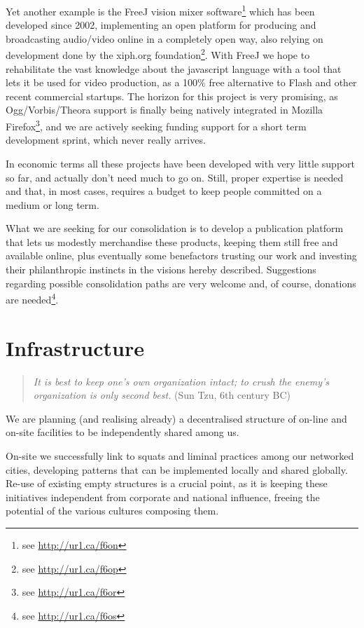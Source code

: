 Yet another example is the FreeJ vision mixer software\footnote{see
\url{http://ur1.ca/f6on}} which has been developed since 2002, implementing an
open platform for producing and broadcasting audio/video online in a completely
open way, also relying on development done by the xiph.org
foundation\footnote{see \url{http://ur1.ca/f6op}}. With FreeJ we hope to
rehabilitate the vast knowledge about the javascript language with a tool that
lets it be used for video production, as a 100\% free alternative to
F\hbox{}lash and other recent commercial startups. The horizon for this project
is very promising, as Ogg/Vorbis/Theora support is f\hbox{}inally being natively
integrated in Mozilla F\hbox{}irefox\footnote{see \url{http://ur1.ca/f6or}}, and
we are actively seeking funding support for a short term development sprint,
which never really arrives.

In economic terms all these projects have been developed with very little
support so far, and actually don't need much to go on. Still, proper expertise
is needed and that, in most cases, requires a budget to keep people committed on
a medium or long term.

What we are seeking for our consolidation is to develop a publication platform
that lets us modestly merchandise these products, keeping them still free and
available online, plus eventually some benefactors trusting our work and
investing their philanthropic instincts in the visions hereby described.
Suggestions regarding possible consolidation paths are very welcome and, of
course, donations are needed\footnote{see \url{http://ur1.ca/f6os}}.


\section{Infrastructure}
\label{s:weaver_birds:infrastructure}

\begin{quote}
\textit{It is best to keep one's own organization intact; to crush the enemy's
organization is only second best.} (Sun Tzu, 6th century BC)
\end{quote}

We are planning (and realising already) a decentralised structure of on-line and
on-site facilities to be independently shared among us.

On-site we successfully link to squats and liminal practices among our networked
cities, developing patterns that can be implemented locally and shared globally.
Re-use of existing empty structures is a crucial point, as it is keeping these
initiatives independent from corporate and national inf\hbox{}luence, freeing
the potential of the various cultures composing them.

